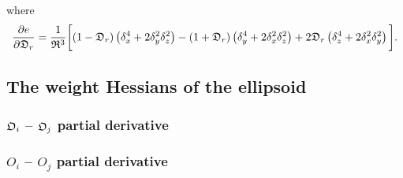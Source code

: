 \noindent where
\begin{equation}
    \frac{\partial e}{\partial \mathfrak{D}_r} = \frac{1}{\mathfrak{R}^3} \bigg[ (1 - \mathfrak{D}_r) \left(\delta_x^4 + 2\delta_y^2\delta_z^2\right)
        - (1 + \mathfrak{D}_r) \left(\delta_y^4 + 2\delta_x^2\delta_z^2\right) + 2 \mathfrak{D}_r \left(\delta_z^4 + 2\delta_x^2\delta_y^2\right) \bigg].
\end{equation}




\newpage
\subsection{The weight Hessians of the ellipsoid}


\begin{latexonly}
    \subsubsection{$\mathfrak{O}_i$ -- $\mathfrak{O}_j$ partial derivative}
\end{latexonly}
\begin{htmlonly}
    \subsubsection{$O_i$ -- $O_j$ partial derivative}
\end{htmlonly}

